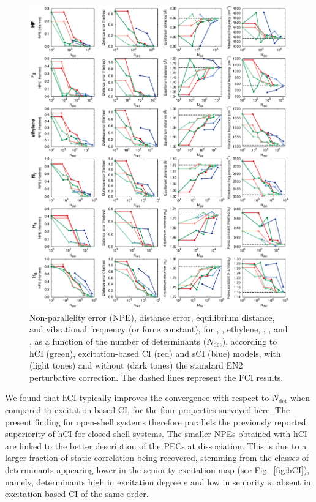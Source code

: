 \documentclass[aip,jcp,reprint,noshowkeys,superscriptaddress]{revtex4-1}
\newcommand{\Ndet}{N_\text{det}}
\begin{document}
\begin{figure}%
\includegraphics[width=1.0\linewidth]{plot_all_closed}
\caption{
Non-parallelity error (NPE), distance error, equilibrium distance, and vibrational frequency (or force constant), for , , ethylene, , , and , 
as a function of the number of determinants ($\Ndet$), according to hCI (green), excitation-based CI (red) and sCI (blue) models,
with (light tones) and without (dark tones) the standard EN2 perturbative correction.
The dashed lines represent the FCI results.}
\label{fig:plot_all_closed}
\end{figure}

We found that hCI typically improves the convergence with respect to $\Ndet$ when compared to excitation-based CI, for the four properties surveyed here.
The present finding for open-shell systems therefore parallels the previously reported superiority of hCI for closed-shell systems. \cite{Kossoski_2022}
The smaller NPEs obtained with hCI are linked to the better description of the PECs at dissociation.
This is due to a larger fraction of static correlation being recovered,
stemming from the classes of determinants appearing lower in the seniority-excitation map (see Fig.~\ref{fig:hCI}),
namely, determinants high in excitation degree $e$ and low in seniority $s$, absent in excitation-based CI of the same order.
\end{document}
